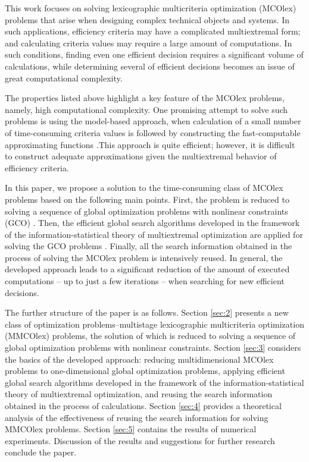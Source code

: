 \documentclass[smallextended]{svjour3}       %
\begin{document}
This work focuses on solving lexicographic multicriteria optimization (MCOlex) problems that arise when designing complex technical objects and systems. In such applications, efficiency criteria may have a complicated multiextremal form; and calculating criteria values may require a large amount of computations. In such conditions, finding even one efficient decision requires a significant volume of calculations, while determining several  of efficient decisions becomes an issue of great computational complexity.

The properties listed above highlight a key feature of the MCOlex problems, namely, high computational complexity. One promising attempt to solve such problems is using the model-based approach, when calculation of a small number of time-consuming criteria values is followed by constructing the fast-computable approximating functions \cite{c15,c16}.This approach is quite efficient; however, it is difficult to construct adequate approximations given the multiextremal behavior of efficiency criteria.

In this paper, we propose a solution to the time-consuming class of MCOlex problems based on the following main points. First, the problem is reduced to solving a sequence of global optimization problems with nonlinear constraints (GCO) \cite{c2,c14}. Then, the efficient global search algorithms developed in the framework of the information-statistical theory of multiextremal optimization are applied for solving the GCO problems \cite{c17,c18}. Finally, all the search information obtained in the process of solving the MCOlex problem is intensively reused. In general, the developed approach leads to a significant reduction of the amount of executed computations -- up to just a few iterations -- when searching for new efficient decisions.

The further structure of the paper is as follows. Section \ref{sec:2} presents a new class of optimization problems–multistage lexicographic multicriteria optimization (MMCOlex) problems, the solution of which is reduced to solving a sequence of global optimization problems with nonlinear constraints. Section \ref{sec:3} considers the basics of the developed approach: reducing multidimensional MCOlex problems to one-dimensional global optimization problems, applying efficient global search algorithms developed in the framework of the information-statistical theory of multiextremal optimization, and reusing the search information obtained in the process of calculations. Section \ref{sec:4} provides a theoretical analysis of the effectiveness of reusing the search information for solving MMCOlex problems. Section \ref{sec:5} contains the results of numerical experiments. Discussion of the results and suggestions for further research conclude the paper.
\end{document}
